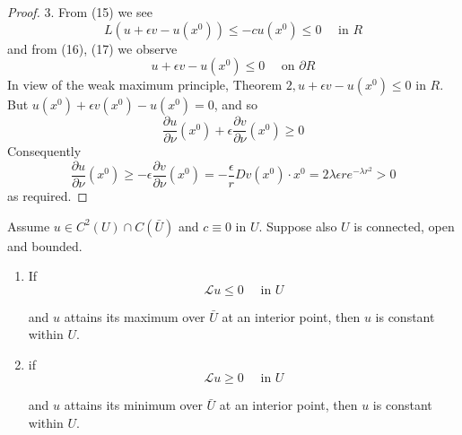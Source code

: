 \begin{theorem}
\begin{proof}
        3. From (15) we see
        \begin{equation*}
            L\left(u+\epsilon v-u\left(x^0\right)\right) \leq-c u\left(x^0\right) \leq 0 \quad \text { in } R
        \end{equation*}
        and from (16), (17) we observe
        \begin{equation*}
            u+\epsilon v-u\left(x^0\right) \leq 0 \quad \text { on } \partial R
        \end{equation*}
        In view of the weak maximum principle, Theorem $2, u+\epsilon v-u\left(x^0\right) \leq 0$ in $R$. But $u\left(x^0\right)+\epsilon v\left(x^0\right)-u\left(x^0\right)=0$, and so
        \begin{equation*}
            \frac{\partial u}{\partial \nu}\left(x^0\right)+\epsilon \frac{\partial v}{\partial \nu}\left(x^0\right) \geq 0
        \end{equation*}
        Consequently
        \begin{equation*}
            \frac{\partial u}{\partial \nu}\left(x^0\right) \geq-\epsilon \frac{\partial v}{\partial \nu}\left(x^0\right)
            =
            -\frac{\epsilon}{r} D v\left(x^0\right) \cdot x^0=2 \lambda \epsilon r e^{-\lambda r^2}>0
        \end{equation*}
        as required.
    \end{proof}
\end{theorem}



\begin{theorem}
    Assume $u \in C^2(U) \cap C(\bar{U})$ and $c \equiv 0$ in $U$.
    Suppose also $U$ is connected, open and bounded.
    \begin{enumerate}
        \item
              If
              \begin{equation*}
                  \mathcal{L} u \leq 0 \quad \text { in } U
              \end{equation*}

              and $u$ attains its maximum over $\bar{U}$ at an interior point, then
              $u$ is constant within $U$.
        \item
              if
              \begin{equation*}
                  \mathcal{L} u \geq 0 \quad \text { in } U
              \end{equation*}

              and $u$ attains its minimum over $\bar{U}$ at an interior point, then $u$ is constant within $U$.
    \end{enumerate}
\end{theorem}






